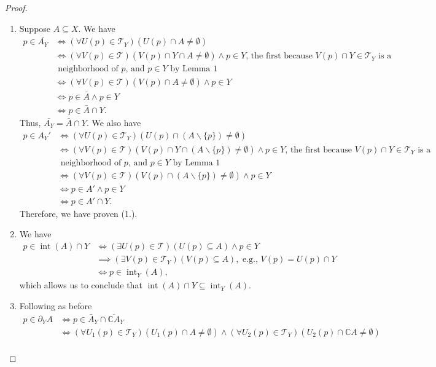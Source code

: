 \documentclass[10pt,a4paper]{article}
\theoremstyle{theorem}
\theoremstyle{definition}
\DeclareMathOperator{\interior}{int}
\newcommand{\Tau}{\mathcal{T}}
\begin{document}
\begin{proof}
\begin{enumerate}
\item Suppose $A \subseteq X$. We have 
\begin{align*}
p \in \bar{A_Y} &\iff (\forall U(p) \in \Tau_Y)(U(p) \cap A \not = \emptyset)\\
&\iff (\forall V(p) \in \Tau)(V(p) \cap Y \cap A \not = \emptyset) \land p \in Y\text{, the first because } V(p) \cap Y \in \Tau_Y \text{ is a} \\
&\text{ neighborhood of } p \text{, and } p \in Y \text{ by Lemma 1}\\
&\iff (\forall V(p) \in \Tau)(V(p) \cap A \not = \emptyset) \land p \in Y\\
&\iff p \in \bar{A} \land p \in Y\\
&\iff p \in \bar{A} \cap Y.
\end{align*}
Thus,  $\bar{A_Y} = \bar{A} \cap Y$.  We also have
\begin{align*}
p \in A_Y' &\iff (\forall U(p) \in \Tau_Y)(U(p) \cap (A \backslash \{p\}) \not = \emptyset)\\
&\iff (\forall V(p) \in \Tau)(V(p) \cap Y \cap (A \backslash \{p\}) \not = \emptyset) \land p \in Y\text{, the first because } V(p) \cap Y \in \Tau_Y \text{ is a} \\
&\text{ neighborhood of } p \text{, and } p \in Y \text{ by Lemma 1}\\
&\iff (\forall V(p) \in \Tau)(V(p) \cap (A \backslash \{p\}) \not = \emptyset) \land p \in Y\\
&\iff p \in A' \land p \in Y\\
&\iff p \in A' \cap Y.
\end{align*}
Therefore, we have proven (1.).
\item We have 
\begin{align*}
p \in \interior(A) \cap Y &\iff (\exists U(p) \in \Tau)(U(p) \subseteq A) \land p \in Y\\
&\implies (\exists V(p) \in \Tau_Y)(V(p) \subseteq A), \text{ e.g., } V(p) = U(p) \cap Y\\
&\iff p \in \interior_Y(A) \text{,}
\end{align*}
which allows us to conclude that $\interior(A) \cap Y \subseteq \interior_Y (A)$.
\item Following as before
\begin{align*}
p \in \partial_Y A &\iff p \in \bar{A}_Y \cap \overline{\mathbb{C}A}_Y\\
&\iff (\forall U_1(p) \in \Tau_Y)(U_1(p) \cap A \not = \emptyset) \land (\forall U_2(p) \in \Tau_Y)(U_2(p) \cap \mathbb{C}A \not = \emptyset)\\

\end{align*}
\end{enumerate}
\end{proof}
\end{document}
